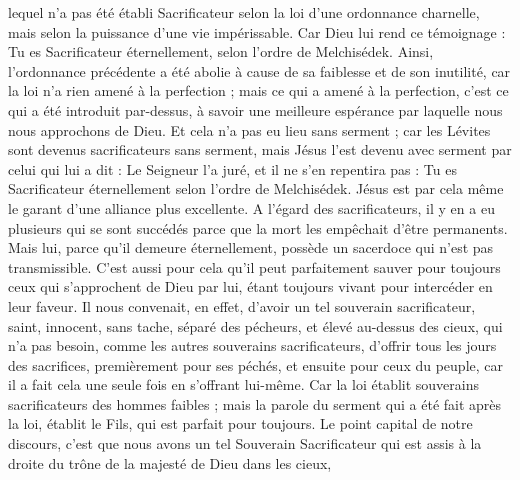 \begin{multicols}{2}
lequel n'a pas été établi Sacrificateur selon la loi d’une ordonnance charnelle, mais selon la puissance d’une vie impérissable.
Car Dieu lui rend ce témoignage : Tu es Sacrificateur éternellement, selon l'ordre de Melchisédek.
Ainsi, l’ordonnance précédente a été abolie à cause de sa faiblesse et de son inutilité,
car la loi n’a rien amené à la perfection ; mais ce qui a amené à la perfection, c’est ce qui a été introduit par-dessus, à savoir une meilleure espérance par laquelle nous nous approchons de Dieu.
Et cela n’a pas eu lieu sans serment ;
car les Lévites sont devenus sacrificateurs sans serment, mais Jésus l’est devenu avec serment par celui qui lui a dit : Le Seigneur l'a juré, et il ne s'en repentira pas : Tu es Sacrificateur éternellement selon l'ordre de Melchisédek.
Jésus est par cela même le garant d’une alliance plus excellente.
A l’égard des sacrificateurs, il y en a eu plusieurs qui se sont succédés parce que la mort les empêchait d’être permanents.
Mais lui, parce qu'il demeure éternellement, possède un sacerdoce qui n’est pas transmissible.
C'est aussi pour cela qu’il peut parfaitement sauver pour toujours ceux qui s'approchent de Dieu par lui, étant toujours vivant pour intercéder en leur faveur.
Il nous convenait, en effet, d'avoir un tel souverain sacrificateur, saint, innocent, sans tache, séparé des pécheurs, et élevé au-dessus des cieux,
qui n’a pas besoin, comme les autres souverains sacrificateurs, d'offrir tous les jours des sacrifices, premièrement pour ses péchés, et ensuite pour ceux du peuple, car il a fait cela une seule fois en s’offrant lui-même.
Car la loi établit souverains sacrificateurs des hommes faibles ; mais la parole du serment qui a été fait après la loi, établit le Fils, qui est parfait pour toujours.
\VerseOne{}Le point capital de notre discours, c'est que nous avons un tel Souverain Sacrificateur qui est assis à la droite du trône de la majesté de Dieu dans les cieux,

\end{multicols}
